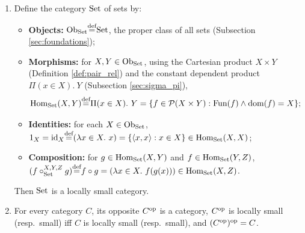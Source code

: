 \documentclass[10pt,a4paper]{article}
\begin{document}
\begin{lemma}\label{lem:set_and_op}
\begin{enumerate}
\item Define the category ${\textrm{Set}}$ of sets by:
  \begin{itemize}
  \item \textbf{Objects:} ${\textrm{Ob}}_{\textrm{Set}} {\stackrel{{\textrm{def}}}{=}} {\textrm{Set}}$, the proper class of all sets (Subsection \ref{sec:foundations});
  \item \textbf{Morphisms:} for $X, Y \in {\textrm{Ob}}_{\textrm{Set}}$, using the Cartesian product $X \times Y$ (Definition \ref{def:pair_rel}) and the constant dependent product $\Pi(x \in X).\ Y$ (Subsection \ref{sec:sigma_pi}),
  $${\textrm{Hom}}_{\textrm{Set}}(X, Y) {\stackrel{{\textrm{def}}}{=}} \Pi(x \in X).\ Y = \{f \in {\mathcal{P}}(X \times Y) : {\textrm{Fun}}(f) \land {\textrm{dom}}(f) = X\};$$
  \item \textbf{Identities:} for each $X \in {\textrm{Ob}}_{\textrm{Set}}$, $1_X = {\textrm{id}}_X {\stackrel{{\textrm{def}}}{=}} (\lambda x \in X.\ x) = \{\langle x, x \rangle : x \in X\} \in {\textrm{Hom}}_{\textrm{Set}}(X, X)$;
  \item \textbf{Composition:} for $g \in {\textrm{Hom}}_{\textrm{Set}}(X, Y)$ and $f \in {\textrm{Hom}}_{\textrm{Set}}(Y, Z)$, $(f \circ_{\textrm{Set}}^{X,Y,Z} g) {\stackrel{{\textrm{def}}}{=}} f \circ g = (\lambda x \in X.\ f(g(x))) \in {\textrm{Hom}}_{\textrm{Set}}(X, Z)$.
  \end{itemize}
  Then ${\textrm{Set}}$ is a locally small category.
\item For every category $C$, its opposite $C^{\textrm{op}}$ is a category, $C^{\textrm{op}}$ is locally small (resp.\ small) iff $C$ is locally small (resp.\ small), and $(C^{\textrm{op}})^{\textrm{op}} = C$.
\end{enumerate}
\end{lemma}
\myprf
\end{document}
